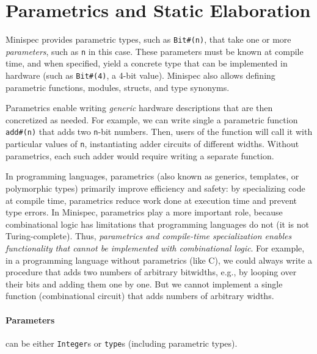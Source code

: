 \section{Parametrics and Static Elaboration}
\label{sec:parametrics}

Minispec provides parametric types, such as \texttt{Bit\#(n)},
that take one or more \emph{parameters}, such as \texttt{n} in this case.
These parameters must be known at compile time, and when specified,
yield a concrete type that can be implemented in hardware (such as \texttt{Bit\#(4)}, a 4-bit value).
Minispec also allows defining parametric functions, modules, structs, and type synonyms.

Parametrics enable writing \emph{generic} hardware descriptions
that are then concretized as needed. For example,
we can write single a parametric function \texttt{add\#(n)}
that adds two \texttt{n}-bit numbers.
Then, users of the function will call it with particular values of \texttt{n},
instantiating adder circuits of different widths.
Without parametrics, each such adder would require writing a separate function.

In programming languages, parametrics (also known as generics, templates, or polymorphic types)
primarily improve efficiency and safety: by specializing code at compile time,
parametrics reduce work done at execution time and prevent type errors.
In Minispec, parametrics play a more important role,
because combinational logic has limitations that programming languages do not (it is not Turing-complete).
Thus, \emph{parametrics and compile-time specialization enables functionality that cannot be implemented with combinational logic}.
For example, in a programming language without parametrics (like C),
we could always write a procedure that adds two numbers of arbitrary bitwidths,
e.g., by looping over their bits and adding them one by one.
But we cannot implement a single function (combinational circuit)
that adds numbers of arbitrary widths.


\paragraph{Parameters} can be either \texttt{Integer}s or \texttt{type}s (including parametric types).

